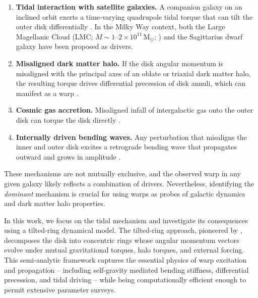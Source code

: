 \begin{enumerate}
    \item \textbf{Tidal interaction with satellite galaxies.} A companion galaxy on an inclined orbit exerts a time-varying quadrupole tidal torque that can tilt the outer disk differentially \citep{hunter1969, ostriker1989, weinberg1998, tsuchiya2002}. In the Milky Way context, both the Large Magellanic Cloud (LMC; $M\sim1$--$2\times10^{11}\,\mathrm{M}_\odot$; \citealt{erkal2019}) and the Sagittarius dwarf galaxy \citep{laporte2018, bennett2022} have been proposed as drivers.
    
    \item \textbf{Misaligned dark matter halo.} If the disk angular momentum is misaligned with the principal axes of an oblate or triaxial dark matter halo, the resulting torque drives differential precession of disk annuli, which can manifest as a warp \citep{debattista1999, sparke1988}.
    
    \item \textbf{Cosmic gas accretion.} Misaligned infall of intergalactic gas onto the outer disk can torque the disk directly \citep{lopezcorredoira2002}.
    
    \item \textbf{Internally driven bending waves.} Any perturbation that misaligns the inner and outer disk excites a retrograde bending wave that propagates outward and grows in amplitude \citep{sellwood2022}.
\end{enumerate}

These mechanisms are not mutually exclusive, and the observed warp in any given galaxy likely reflects a combination of drivers. Nevertheless, identifying the \emph{dominant} mechanism is crucial for using warps as probes of galactic dynamics and dark matter halo properties.

In this work, we focus on the tidal mechanism and investigate its consequences using a tilted-ring dynamical model. The tilted-ring approach, pioneered by \citet{sparke1988}, decomposes the disk into concentric rings whose angular momentum vectors evolve under mutual gravitational torques, halo torques, and external forcing. This semi-analytic framework captures the essential physics of warp excitation and propagation -- including self-gravity mediated bending stiffness, differential precession, and tidal driving -- while being computationally efficient enough to permit extensive parameter surveys.

